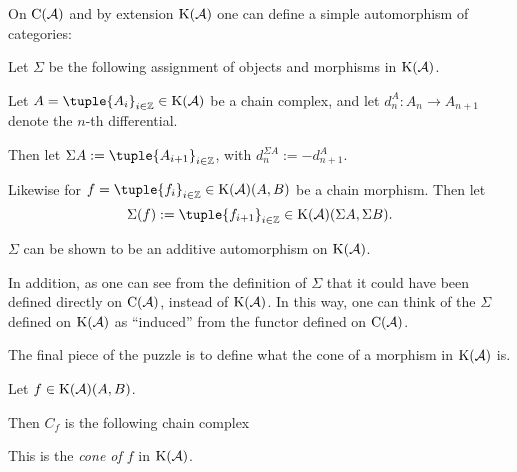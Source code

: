 On \( \operatorname{C}({\mathcal{A}}) \) and by extension \( \K(\Ac) \) one can define a simple automorphism of categories:

\begin{definition}
    \label{def:chain_homotopy_shift}
    Let \( \Sigma \) be the following assignment of objects and morphisms in \( \K(\Ac) \).

    Let \( A = \tuple{A_i}_{i \in \Zb} \in \K(\Ac) \) be a chain complex, and let \( d_n^A: A_n \to A_{n + 1} \) denote the \( n \)-th differential.

    Then let \( \Sigma A := \tuple{A_{i + 1}}_{i \in \Zb} \), with \( d_n^{\Sigma A} := -d_{n + 1}^A \).

    Likewise for \( f = \tuple{f_i}_{i \in \Zb} \in \K(\Ac)(A, B) \) be a chain morphism. Then let
    \[
        \Sigma(f) := \tuple{f_{i + 1}}_{i \in \Zb} \in \K(\Ac)(\Sigma A, \Sigma B).
    \]
\end{definition}

\( \Sigma \) can be shown to be an additive automorphism on \( \K(\Ac) \).

In addition, as one can see from the definition of \( \Sigma \) that it could have been defined directly on \( \operatorname{C}({\mathcal{A}}) \), instead of \( \K(\Ac) \). In this way, one can think of the \( \Sigma \) defined on \( \K(\Ac) \) as ``induced'' from the functor defined on \( \operatorname{C}({\mathcal{A}}) \).

The final piece of the puzzle is to define what the cone of a morphism in \( \K(\Ac) \) is.

\begin{definition}[Cone in \( \K(\Ac) \)]
    Let \( f \in \operatorname{K}({\mathcal{A}})(A, B) \).

    Then \( C_f \) is the following chain complex
    \begin{center}
    \end{center}

    This is the \emph{cone of \( f \)} in \( \K(\Ac) \).
\end{definition}

